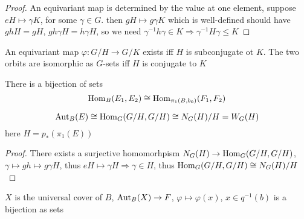 \documentclass[../main.tex]{subfiles}
\begin{document}
\begin{proof}
An equivariant map is determined by the value at one element, suppose $eH\mapsto\gamma K$, for some $\gamma\in G$. then $gH\mapsto g\gamma K$ which is well-defined should have $ghH=gH$, $gh\gamma H=h\gamma H$, so we need $\gamma^{-1}h\gamma\in K\Rightarrow \gamma^{-1}H\gamma\leq K$
\end{proof}

\begin{corollary}
An equivariant map $\varphi:G/H\to G/K$ exists iff $H$ is subconjugate ot $K$. The two orbits are isomorphic as $G$-sets iff $H$ is conjugate to $K$
\end{corollary}

\begin{theorem}
There is a bijection of sets
\[\operatorname{Hom}_B(E_1,E_2)\cong\operatorname{Hom}_{\pi_1(B,b_0)}(F_1,F_2)\]
\end{theorem}

\begin{corollary}
\[\operatorname{Aut}_B(E)\cong \operatorname{Hom}_G(G/H,G/H)\cong N_G(H)/H=W_G(H)\]
here $H=p_*(\pi_1(E))$
\end{corollary}

\begin{proof}
There exists a surjective homomorhpism $N_G(H)\to\operatorname{Hom}_G(G/H,G/H)$, $\gamma\mapsto gh\mapsto g\gamma H$, thus $eH\mapsto\gamma H\Rightarrow \gamma\in H$, thus $\operatorname{Hom}_G(G/H,G/H)\cong N_G(H)/H$
\end{proof}

\begin{proposition}
$X$ is the universal cover of $B$, $\operatorname{Aut}_B(X)\to F$, $\varphi\mapsto\varphi(x)$, $x\in q^{-1}(b)$ is a bijection as sets
\end{proposition}
\end{document}
